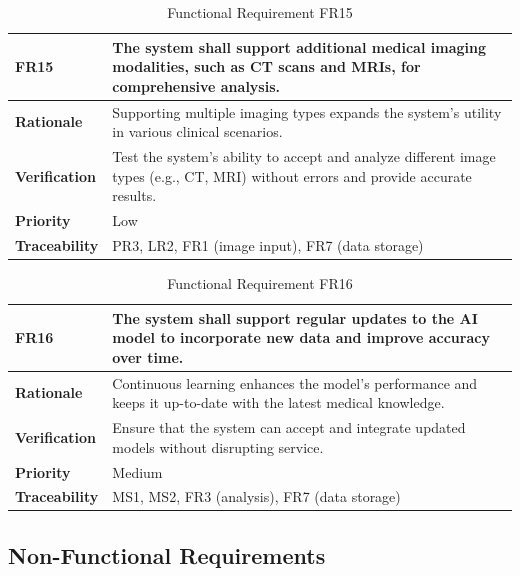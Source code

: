\documentclass[12pt]{article}
\begin{document}
\begin{table}[h!]
\centering
{}
\begin{tabular}{|p{3.5cm}|p{11.5cm}|}
\hline
\rowcolor{gray!30}
\textbf{FR15} & The system shall support additional medical imaging modalities, such as CT scans and MRIs, for comprehensive analysis. \\
\hline
\textbf{Rationale} & Supporting multiple imaging types expands the system's utility in various clinical scenarios. \\
\hline
\textbf{Verification} & Test the system's ability to accept and analyze different image types (e.g., CT, MRI) without errors and provide accurate results. \\
\hline
\textbf{Priority} & Low \\
\hline
\textbf{Traceability} & PR3, LR2, FR1 (image input), FR7 (data storage) \\
\hline
\end{tabular}
\caption{Functional Requirement FR15}
\end{table}

\begin{table}[h!]
\centering
{}
\begin{tabular}{|p{3.5cm}|p{11.5cm}|}
\hline
\rowcolor{gray!30}
\textbf{FR16} & The system shall support regular updates to the AI model to incorporate new data and improve accuracy over time. \\
\hline
\textbf{Rationale} & Continuous learning enhances the model's performance and keeps it up-to-date with the latest medical knowledge. \\
\hline
\textbf{Verification} & Ensure that the system can accept and integrate updated models without disrupting service. \\
\hline
\textbf{Priority} & Medium \\
\hline
\textbf{Traceability} & MS1, MS2, FR3 (analysis), FR7 (data storage) \\
\hline
\end{tabular}
\caption{Functional Requirement FR16}
\end{table}  
\clearpage                                                                                                                                                    

\subsection{Non-Functional Requirements}
\end{document}
